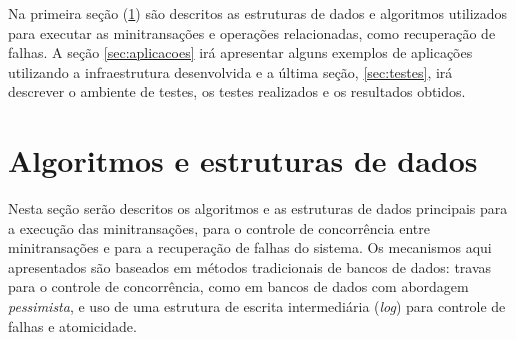 \documentclass[11pt,twoside,a4paper]{book}
\begin{document}
Na primeira seção (\ref{sec:algoritmos}) são descritos as estruturas de dados e algoritmos utilizados para executar as minitransações e operações relacionadas, como recuperação de falhas. A seção \ref{sec:aplicacoes} irá apresentar alguns exemplos de aplicações utilizando a infraestrutura desenvolvida e a última seção, \ref{sec:testes}, irá descrever o ambiente de testes, os testes realizados e os resultados obtidos.

\section{Algoritmos e estruturas de dados}
\label{sec:algoritmos}
Nesta seção serão descritos os algoritmos e as estruturas de dados principais para a execução das minitransações, para o controle de concorrência entre minitransações e para a recuperação de falhas do sistema. Os mecanismos aqui apresentados são baseados em métodos tradicionais de bancos de dados: travas para o controle de concorrência, como em bancos de dados com abordagem \emph{pessimista}, e uso de uma estrutura de escrita intermediária (\emph{log}) para controle de falhas e atomicidade.
\end{document}
